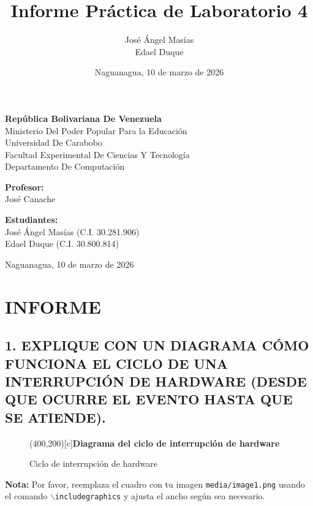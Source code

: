 \documentclass[12pt]{article}
\title{Informe Práctica de Laboratorio 4}
\author{José Ángel Masías \\ Edael Duque}
\date{Naguanagua, 10 de marzo de 2026}
\begin{document}
\maketitle

\begin{center}
\textbf{República Bolivariana De Venezuela} \\
Ministerio Del Poder Popular Para la Educación \\
Universidad De Carabobo \\
Facultad Experimental De Ciencias Y Tecnología \\
Departamento De Computación \\
\end{center}

\vspace{1cm}

\begin{center}
\textbf{Profesor:} \\
José Canache \\
\end{center}

\vspace{1cm}

\begin{center}
\textbf{Estudiantes:} \\
José Ángel Masías (C.I. 30.281.906) \\
Edael Duque (C.I. 30.800.814) \\
\end{center}

\vspace{1cm}

\begin{center}
Naguanagua, 10 de marzo de 2026
\end{center}

\newpage

\section*{INFORME}

\subsection*{1. EXPLIQUE CON UN DIAGRAMA CÓMO FUNCIONA EL CICLO DE UNA INTERRUPCIÓN DE HARDWARE (DESDE QUE OCURRE EL EVENTO HASTA QUE SE ATIENDE).}

\begin{figure}[h]
    \centering
    \framebox(400,200)[c]{\textbf{Diagrama del ciclo de interrupción de hardware}}
    \caption{Ciclo de interrupción de hardware}
    \label{fig:interrupcion}
\end{figure}
\textbf{Nota:} Por favor, reemplaza el cuadro con tu imagen \texttt{media/image1.png} usando el comando \texttt{$\backslash$includegraphics} y ajusta el ancho según sea necesario.
\end{document}
